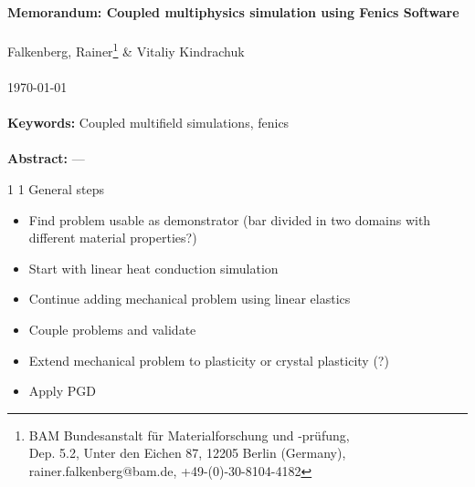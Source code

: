 \documentclass[11pt,a4paper]{article}
\makeatletter
\renewcommand\section{\@startsection
   {section}{1}{0mm}%
   {1\baselineskip}%
   {1\baselineskip}%
   {\bfseries\bf\normalsize}%
   }
\makeatother
\begin{document}
%
{\large\bf\textsf{Memorandum: Coupled multiphysics simulation using Fenics Software}}\\\\
{\textsf{Falkenberg, Rainer\footnote{BAM Bundesanstalt f\"ur Materialforschung und -pr\"ufung,\\Dep. 5.2, Unter den Eichen 87, 12205 Berlin (Germany),\\ rainer.falkenberg@bam.de, +49-(0)-30-8104-4182}} \& Vitaliy Kindrachuk\footnotemark[1]}\\\\
\today\\\\
%
{\normalsize\bf\textsf{Keywords:}} \textsf{Coupled multifield simulations, fenics}\\\\
{\normalsize\bf\textsf{Abstract:}} ---
%
%
\section{General steps}
%
\begin{itemize}[nosep]
\item Find problem usable as demonstrator (bar divided in two domains with different material properties?)
\item Start with linear heat conduction simulation
\item Continue adding mechanical problem using linear elastics
\item Couple problems and validate
\item Extend mechanical problem to plasticity or crystal plasticity (?)
\item Apply PGD
\end{itemize}

%
%
%
%
%
\end{document}
